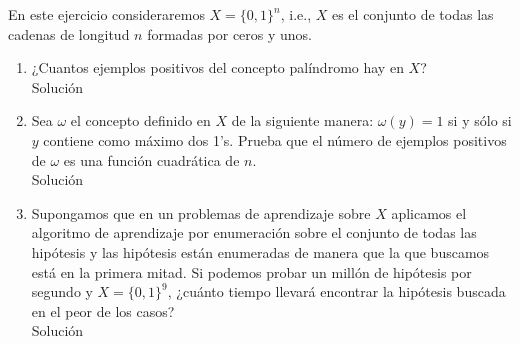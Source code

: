 \documentclass{mulcia_aa}
\begin{document}
\begin{problem}
En este ejercicio consideraremos $X = \{0, 1\}^n$, i.e., $X$ es el conjunto de todas las cadenas de longitud $n$ formadas por ceros y unos.
\end{problem}
\begin{solution}
    \begin{enumerate}
        \item ¿Cuantos ejemplos positivos del concepto palíndromo hay en $X$?\\
        
        Solución    
        
        \item Sea $\omega$ el concepto definido en $X$ de la siguiente manera: $\omega(y) = 1$ si y sólo si $y$ contiene como máximo dos 1’s. Prueba que el número de ejemplos positivos de $\omega$ es una función cuadrática de $n$.\\
        
        Solución    
        
        \item Supongamos que en un problemas de aprendizaje sobre $X$ aplicamos el algoritmo de aprendizaje por enumeración sobre el conjunto de todas las hipótesis y las hipótesis están enumeradas de manera que la que buscamos está en la primera mitad. Si podemos probar un millón de hipótesis por segundo y $X = \{0, 1\}^9$, ¿cuánto tiempo llevará encontrar la hipótesis buscada en el peor de los casos?\\
        
        Solución
    \end{enumerate}
\end{solution}
\end{document}
